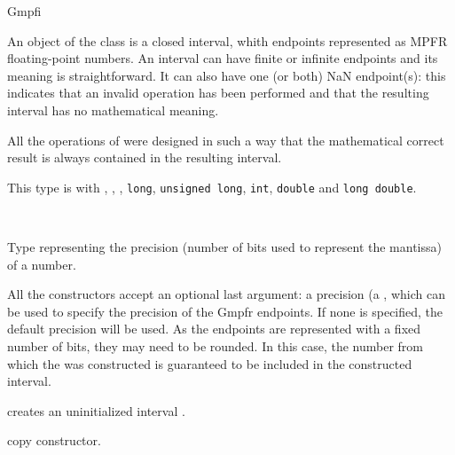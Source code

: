 \begin{ccRefClass} {Gmpfi}
\label{Gmpfi}

\ccDefinition

An object of the class  is a closed interval, whith
endpoints represented as MPFR floating-point numbers.  An interval can
have finite or infinite endpoints and its meaning is straightforward.
It can also have one (or both) NaN endpoint(s): this indicates that an
invalid operation has been performed and that the resulting interval
has no mathematical meaning.

All the operations of  were designed in such a way that the
mathematical correct result is always contained in the resulting interval.

This type is  with , ,
, \verb-long-, \verb-unsigned long-, \verb-int-, \verb-double-
and \verb-long double-.


\ccIsModel
{}\\

\ccTypes

                {Type representing the precision (number of bits
                used to represent the mantissa) of a number.}

\ccCreation

All the constructors accept an optional last argument: a precision
(a , which can be used to specify the precision
of the Gmpfr endpoints. If none is specified, the default precision
will be used. As the endpoints are represented with a fixed number of
bits, they may need to be rounded. In this case, the number from which
the  was constructed is guaranteed to be included in the
constructed interval.


        {creates an uninitialized  interval \ccVar.}

\ccHidden {}
        {copy constructor.}



\end{ccRefClass}
